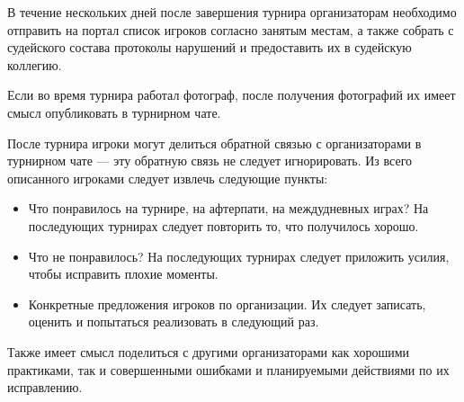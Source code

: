 В течение нескольких дней после завершения турнира организаторам необходимо отправить на портал список игроков согласно занятым местам, а также собрать с судейского состава протоколы нарушений и предоставить их в судейскую коллегию. 

Если во время турнира работал фотограф, после получения фотографий их имеет смысл опубликовать в турнирном чате.

После турнира игроки могут делиться обратной связью с организаторами в турнирном чате --- эту обратную связь не следует игнорировать. Из всего описанного игроками следует извлечь следующие пункты:
\begin{itemize}
	\item Что понравилось на турнире, на афтерпати, на междудневных играх? На последующих турнирах следует повторить то, что получилось хорошо.
	\item Что не понравилось? На последующих турнирах следует приложить усилия, чтобы исправить плохие моменты.
	\item Конкретные предложения игроков по организации. Их следует записать, оценить и попытаться реализовать в следующий раз.
\end{itemize}

Также имеет смысл поделиться с другими организаторами как хорошими практиками, так и совершенными ошибками и планируемыми действиями по их исправлению. 
